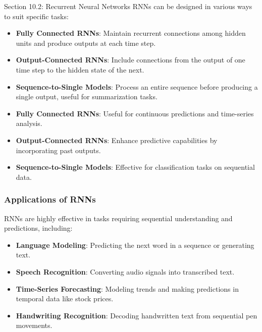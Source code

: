 \begin{notes}{Section 10.2: Recurrent Neural Networks}
    RNNs can be designed in various ways to suit specific tasks:
    \begin{itemize}
        \item \textbf{Fully Connected RNNs}: Maintain recurrent connections among hidden units and produce outputs at each time step.
        \item \textbf{Output-Connected RNNs}: Include connections from the output of one time step to the hidden state of the next.
        \item \textbf{Sequence-to-Single Models}: Process an entire sequence before producing a single output, useful for summarization tasks.
    \end{itemize}
    
    \begin{highlight}
        \begin{itemize}
            \item \textbf{Fully Connected RNNs}: Useful for continuous predictions and time-series analysis.
            \item \textbf{Output-Connected RNNs}: Enhance predictive capabilities by incorporating past outputs.
            \item \textbf{Sequence-to-Single Models}: Effective for classification tasks on sequential data.
        \end{itemize}
    \end{highlight}
    
    \subsubsection*{Applications of RNNs}
    
    RNNs are highly effective in tasks requiring sequential understanding and predictions, including:
    \begin{itemize}
        \item \textbf{Language Modeling}: Predicting the next word in a sequence or generating text.
        \item \textbf{Speech Recognition}: Converting audio signals into transcribed text.
        \item \textbf{Time-Series Forecasting}: Modeling trends and making predictions in temporal data like stock prices.
        \item \textbf{Handwriting Recognition}: Decoding handwritten text from sequential pen movements.
    \end{itemize}
    

\end{notes}

